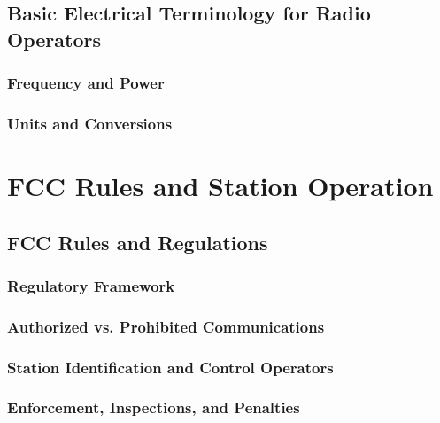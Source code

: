 \documentclass[12pt]{book}
\begin{document}
\chapter{Basic Electrical Terminology for Radio Operators}
\section{Frequency and Power}

\section{Units and Conversions}

\part{FCC Rules and Station Operation}
\chapter{FCC Rules and Regulations}
\section{Regulatory Framework}

\section{Authorized vs. Prohibited Communications}






\section{Station Identification and Control Operators}


\section{Enforcement, Inspections, and Penalties}


\end{document}

